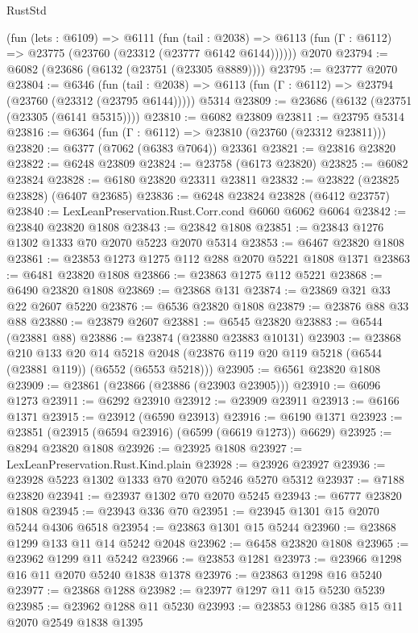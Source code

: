 \begin{lexlean}{RustStd}
\begin{coremodule}
    (fun (lets : @6109) =>
    @6111
      (fun (tail : @2038) =>
      @6113 (fun (Γ : @6112) => @23775 (@23760 (@23312 (@23777 @6142 @6144))))))
    @2070
@23794 := @6082 (@23686 (@6132 (@23751 (@23305 @8889))))
@23795 := @23777 @2070
@23804 := @6346
    (fun (tail : @2038) => @6113 (fun (Γ : @6112) => @23794 (@23760 (@23312 (@23795 @6144)))))
    @5314
@23809 := @23686 (@6132 (@23751 (@23305 (@6141 @5315))))
@23810 := @6082 @23809
@23811 := @23795 @5314
@23816 := @6364 (fun (Γ : @6112) => @23810 (@23760 (@23312 @23811)))
@23820 := @6377 (@7062 (@6383 @7064)) @23361
@23821 := @23816 @23820
@23822 := @6248 @23809
@23824 := @23758 (@6173 @23820)
@23825 := @6082 @23824
@23828 := @6180 @23820 @23311 @23811
@23832 := @23822 (@23825 @23828) (@6407 @23685)
@23836 := @6248 @23824 @23828 (@6412 @23757)
@23840 := LexLeanPreservation.Rust.Corr.cond @6060 @6062 @6064
@23842 := @23840 @23820 @1808
@23843 := @23842 @1808
@23851 := @23843 @1276 @1302 @1333 @70 @2070 @5223 @2070 @5314
@23853 := @6467 @23820 @1808
@23861 := @23853 @1273 @1275 @112 @288 @2070 @5221 @1808 @1371
@23863 := @6481 @23820 @1808
@23866 := @23863 @1275 @112 @5221
@23868 := @6490 @23820 @1808
@23869 := @23868 @131
@23874 := @23869 @321 @33 @22 @2607 @5220
@23876 := @6536 @23820 @1808
@23879 := @23876 @88 @33 @88
@23880 := @23879 @2607
@23881 := @6545 @23820
@23883 := @6544 (@23881 @88)
@23886 := @23874 (@23880 @23883 @10131)
@23903 := @23868
    @210
    @133
    @20
    @14
    @5218
    @2048
    (@23876 @119 @20 @119 @5218 (@6544 (@23881 @119)) (@6552 (@6553 @5218)))
@23905 := @6561 @23820 @1808
@23909 := @23861 (@23866 (@23886 (@23903 @23905)))
@23910 := @6096 @1273
@23911 := @6292 @23910
@23912 := @23909 @23911
@23913 := @6166 @1371
@23915 := @23912 (@6590 @23913)
@23916 := @6190 @1371
@23923 := @23851 (@23915 (@6594 @23916) (@6599 (@6619 @1273)) @6629)
@23925 := @8294 @23820 @1808
@23926 := @23925 @1808
@23927 := LexLeanPreservation.Rust.Kind.plain
@23928 := @23926 @23927
@23936 := @23928 @5223 @1302 @1333 @70 @2070 @5246 @5270 @5312
@23937 := @7188 @23820
@23941 := @23937 @1302 @70 @2070 @5245
@23943 := @6777 @23820 @1808
@23945 := @23943 @336 @70
@23951 := @23945 @1301 @15 @2070 @5244 @4306 @6518
@23954 := @23863 @1301 @15 @5244
@23960 := @23868 @1299 @133 @11 @14 @5242 @2048
@23962 := @6458 @23820 @1808
@23965 := @23962 @1299 @11 @5242
@23966 := @23853 @1281
@23973 := @23966 @1298 @16 @11 @2070 @5240 @1838 @1378
@23976 := @23863 @1298 @16 @5240
@23977 := @23868 @1288
@23982 := @23977 @1297 @11 @15 @5230 @5239
@23985 := @23962 @1288 @11 @5230
@23993 := @23853 @1286 @385 @15 @11 @2070 @2549 @1838 @1395

\end{coremodule}
\end{lexlean}

